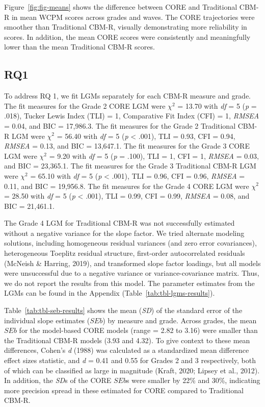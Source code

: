 \documentclass[
  english,
  man, fleqn, noextraspace]{apa6}
\begin{document}
Figure~\ref{fig:fig-means} shows the difference between CORE and Traditional CBM-R in mean WCPM scores across grades and waves. The CORE trajectories were smoother than Traditional CBM-R, visually demonstrating more reliability in scores. In addition, the mean CORE scores were consistently and meaningfully lower than the mean Traditional CBM-R scores.

\hypertarget{rq1}{%
\subsection{RQ1}\label{rq1}}

To address RQ 1, we fit LGMs separately for each CBM-R measure and grade. The fit measures for the Grade 2 CORE LGM were \(\chi^2\) = 13.70 with \emph{df} = 5 (\emph{p} = .018), Tucker Lewis Index (TLI) = 1, Comparative Fit Index (CFI) = 1, \emph{RMSEA} = 0.04, and BIC = 17,986.3. The fit measures for the Grade 2 Traditional CBM-R LGM were \(\chi^2\) = 56.40 with \emph{df} = 5 (\emph{p} \textless{} .001), TLI = 0.93, CFI = 0.94, \emph{RMSEA} = 0.13, and BIC = 13,647.1. The fit measures for the Grade 3 CORE LGM were \(\chi^2\) = 9.20 with \emph{df} = 5 (\emph{p} = .100), TLI = 1, CFI = 1, \emph{RMSEA} = 0.03, and BIC = 23,365.1. The fit measures for the Grade 3 Traditional CBM-R LGM were \(\chi^2\) = 65.10 with \emph{df} = 5 (\emph{p} \textless{} .001), TLI = 0.96, CFI = 0.96, \emph{RMSEA} = 0.11, and BIC = 19,956.8. The fit measures for the Grade 4 CORE LGM were \(\chi^2\) = 28.50 with \emph{df} = 5 (\emph{p} \textless{} .001), TLI = 0.99, CFI = 0.99, \emph{RMSEA} = 0.08, and BIC = 21,461.1.

The Grade 4 LGM for Traditional CBM-R was not successfully estimated without a negative variance for the slope factor. We tried alternate modeling solutions, including homogeneous residual variances (and zero error covariances), heterogeneous Toeplitz residual structure, first-order autocorrelated residuals (McNeish \& Harring, 2019), and transformed slope factor loadings, but all models were unsuccessful due to a negative variance or variance-covariance matrix. Thus, we do not report the results from this model. The parameter estimates from the LGMs can be found in the Appendix (Table~\ref{tab:tbl-lgms-results}).

Table~\ref{tab:tbl-seb-results} shows the mean (\emph{SD}) of the standard error of the individual slope estimates (\(SEb\)) by measure and grade. Across grades, the mean \(SEb\) for the model-based CORE models (range = 2.82 to 3.16) were smaller than the Traditional CBM-R models (3.93 and 4.32). To give context to these mean differences, Cohen's \emph{d} (1988) was calculated as a standardized mean difference effect sizes statistic, and \emph{d} = 0.41 and 0.55 for Grades 2 and 3 respectively, both of which can be classified as large in magnitude (Kraft, 2020; Lipsey et al., 2012). In addition, the \emph{SD}s of the CORE \(SEb\)s were smaller by 22\% and 30\%, indicating more precision spread in these estimated for CORE compared to Traditional CBM-R.
\end{document}
